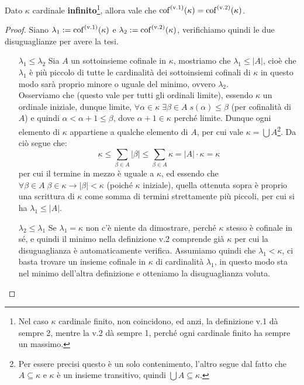 \begin{proposition}
	Dato $\kappa$ cardinale \textbf{infinito}\footnote{Nel caso $\kappa$ cardinale finito, non coincidono, ed anzi, la definizione v.1 dà sempre 2, mentre la v.2 dà sempre 1, perché ogni cardinale finito ha sempre un massimo.},
	allora vale che $\operatorname{cof}^{\text{(v.1)}}(\kappa) = \operatorname{cof}^{\text{(v.2)}}(\kappa)$.
\end{proposition}

\begin{proof}
	Siano $\lambda_1 := \operatorname{cof}^{\text{(v.1)}}(\kappa)$ e $\lambda_2 := \operatorname{cof}^{\text{(v.2)}}(\kappa)$, verifichiamo quindi le due disuguaglianze per avere la tesi.
	\begin{itemize}
		\item[$\boxed{\lambda_1 \leq \lambda_2}$] Sia $A$ un sottoinsieme cofinale in $\kappa$, mostriamo che $\lambda_1 \leq |A|$, cioè che $\lambda_1$ è più piccolo di tutte le cardinalità dei sottoinsiemi cofinali di $\kappa$ in questo modo sarà proprio minore o uguale del minimo, ovvero $\lambda_2$.\\
		Osserviamo che (questo vale per tutti gli ordinali limite), essendo $\kappa$ un ordinale iniziale, dunque limite, $\forall \alpha \in \kappa \; \exists \beta \in A \; s(\alpha) \leq \beta$ (per cofinalità di $A$) e quindi $\alpha < \alpha + 1 \leq \beta$, dove $\alpha + 1 \in \kappa$ perché limite. Dunque ogni elemento di $\kappa$
		appartiene a qualche elemento di $A$, per cui vale $\kappa = \bigcup A$\footnote{Per essere precisi questo è un solo contenimento, l'altro segue dal fatto che $A \subseteq \kappa$ e $\kappa$ è un insieme transitivo, quindi $\bigcup A \subseteq \kappa$.}. Da ciò segue che:
		\[ \kappa \leq \sum_{\beta \in A} |\beta| \leq \sum_{\beta \in A} \kappa = |A| \cdot \kappa = \kappa
			\]
		per cui il termine in mezzo è uguale a $\kappa$, ed essendo che $\forall \beta \in A \; \beta \in \kappa \to |\beta| < \kappa$ (poiché $\kappa$ iniziale), quella ottenuta sopra è proprio una scrittura di $\kappa$ come somma di termini strettamente più piccoli, per cui si ha $ \lambda_1 \leq |A|$.
		\item[$\boxed{\lambda_2 \leq \lambda_1}$] Se $\lambda_1 = \kappa$ non c'è niente da dimostrare, perché $\kappa$ stesso è cofinale in sé, e quindi il minimo nella definizione v.2 comprende già $\kappa$ per cui la disuguaglianza è automaticamente verifica. Assumiamo quindi che $\lambda_1 < \kappa$, ci basta trovare un insieme cofinale in $\kappa$ di cardinalità $\lambda_1$, in questo modo sta nel minimo dell'altra definizione e otteniamo la disuguaglianza voluta.

\end{itemize}
\end{proof}
